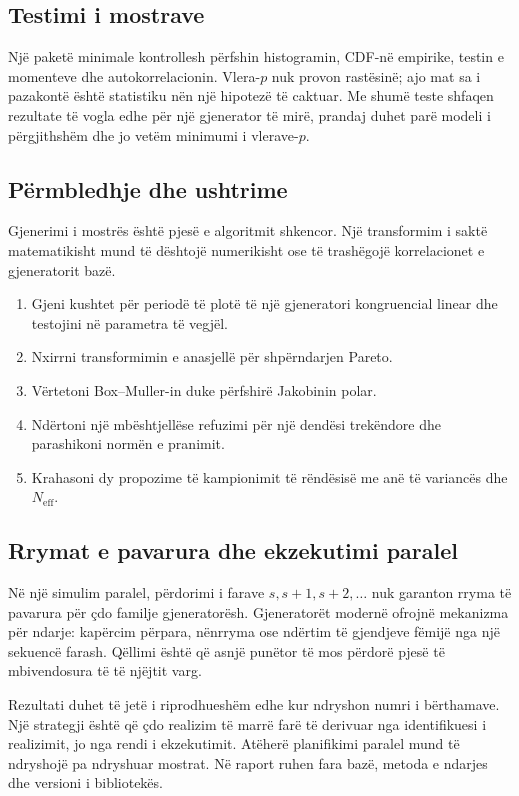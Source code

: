 \documentclass[11pt,oneside,openany]{book}
\begin{document}
\subsection{Testimi i mostrave}
Një paketë minimale kontrollesh përfshin histogramin, CDF-në empirike, testin e momenteve dhe autokorrelacionin. Vlera-$p$ nuk provon rastësinë; ajo mat sa i pazakontë është statistiku nën një hipotezë të caktuar. Me shumë teste shfaqen rezultate të vogla edhe për një gjenerator të mirë, prandaj duhet parë modeli i përgjithshëm dhe jo vetëm minimumi i vlerave-$p$.

\subsection{Përmbledhje dhe ushtrime}
Gjenerimi i mostrës është pjesë e algoritmit shkencor. Një transformim i saktë matematikisht mund të dështojë numerikisht ose të trashëgojë korrelacionet e gjeneratorit bazë.
\begin{enumerate}
\item Gjeni kushtet për periodë të plotë të një gjeneratori kongruencial linear dhe testojini në parametra të vegjël.
\item Nxirrni transformimin e anasjellë për shpërndarjen Pareto.
\item Vërtetoni Box--Muller-in duke përfshirë Jakobinin polar.
\item Ndërtoni një mbështjellëse refuzimi për një dendësi trekëndore dhe parashikoni normën e pranimit.
\item Krahasoni dy propozime të kampionimit të rëndësisë me anë të variancës dhe $N_{\mathrm{eff}}$.
\end{enumerate}



\subsection{Rrymat e pavarura dhe ekzekutimi paralel}
Në një simulim paralel, përdorimi i farave $s,s+1,s+2,\ldots$ nuk garanton rryma të pavarura për çdo familje gjeneratorësh. Gjeneratorët modernë ofrojnë mekanizma për ndarje: kapërcim përpara, nënrryma ose ndërtim të gjendjeve fëmijë nga një sekuencë farash. Qëllimi është që asnjë punëtor të mos përdorë pjesë të mbivendosura të të njëjtit varg.

Rezultati duhet të jetë i riprodhueshëm edhe kur ndryshon numri i bërthamave. Një strategji është që çdo realizim të marrë farë të derivuar nga identifikuesi i realizimit, jo nga rendi i ekzekutimit. Atëherë planifikimi paralel mund të ndryshojë pa ndryshuar mostrat. Në raport ruhen fara bazë, metoda e ndarjes dhe versioni i bibliotekës.
\end{document}
